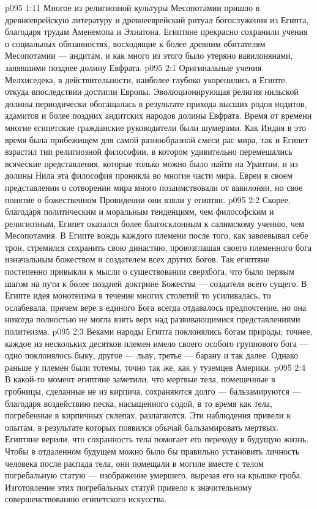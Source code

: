 \vs p095 1:11 Многое из религиозной культуры Месопотамии пришло в древнееврейскую литературу и древнееврейский ритуал богослужения из Египта, благодаря трудам Аменемопа и Эхнатона. Египтяне прекрасно сохранили учения о социальных обязанностях, восходящие к более древним обитателям Месопотамии --- андитам, и как много из этого было утеряно вавилонянами, занявшими позднее долину Евфрата.
\vs p095 2:1 Оригинальные учения Мелхиседека, в действительности, наиболее глубоко укоренились в Египте, откуда впоследствии достигли Европы. Эволюционирующая религия нильской долины периодически обогащалась в результате прихода высших родов нодитов, адамитов и более поздних андитских народов долины Евфрата. Время от времени многие египетские гражданские руководители были шумерами. Как Индия в это время была прибежищем для самой разнообразной смеси рас мира, так и Египет взрастил тип религиозной философии, в котором удивительно перемешались всяческие представления, которые только можно было найти на Урантии, и из долины Нила эта философия проникла во многие части мира. Евреи в своем представлении о сотворении мира много позаимствовали от вавилонян, но свое понятие о божественном Провидении они взяли у египтян.
\vs p095 2:2 Скорее, благодаря политическим и моральным тенденциям, чем философским и религиозным, Египет оказался более благосклонным к салимскому учению, чем Месопотамия. В Египте вождь каждого племени после того, как завоевывал себе трон, стремился сохранить свою династию, провозглашая своего племенного бога изначальным божеством и создателем всех других богов. Так египтяне постепенно привыкли к мысли о существовании сверхбога, что было первым шагом на пути к более поздней доктрине Божества --- создателя всего сущего. В Египте идея монотеизма в течение многих столетий то усиливалась, то ослабевала, причем вере в единого Бога всегда отдавалось предпочтение, но она никогда полностью не могла взять верх над развивающимися представлениями политеизма.
\vs p095 2:3 Веками народы Египта поклонялись богам природы; точнее, каждое из нескольких десятков племен имело своего особого группового бога --- одно поклонялось быку, другое --- льву, третье --- барану и так далее. Однако раньше у племен были тотемы, точно так же, как у туземцев Америки.
\vs p095 2:4 \pc В какой\hyp{}то момент египтяне заметили, что мертвые тела, помещенные в гробницы, сделанные не из кирпича, сохраняются долго --- бальзамируются --- благодаря воздействию песка, насыщенного содой, в то время как тела, погребенные в кирпичных склепах, разлагаются. Эти наблюдения привели к опытам, в результате которых появился обычай бальзамировать мертвых. Египтяне верили, что сохранность тела помогает его переходу в будущую жизнь. Чтобы в отдаленном будущем можно было бы правильно установить личность человека после распада тела, они помещали в могиле вместе с телом погребальную статую --- изображение умершего, вырезая его на крышке гроба. Изготовление этих погребальных статуй привело к значительному совершенствованию египетского искусства.
